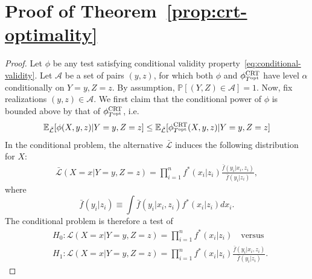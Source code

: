 \documentclass[ejs]{imsart}
\numberwithin{equation}{section}
\theoremstyle{plain}
\theoremstyle{definition}
\theoremstyle{remark}
\newcommand{\srx}{X}
\newcommand{\sfx}{x}
\newcommand{\srz}{Z}
\newcommand{\sfz}{z}
\newcommand{\sry}{Y}
\newcommand{\sfy}{y}
\def\CRT{\textnormal{CRT}}
\begin{document}



\appendix

\section{Proof of Theorem~\ref{prop:crt-optimality}} \label{sec:proofs-sec2}

\begin{proof}
Let $\phi$ be any test satisfying conditional validity property~\eqref{eq:conditional-validity}. Let $\mathcal A$ be a set of pairs $(\sfy, \sfz)$, for which both $\phi$ and $\phi^{\CRT}_{T^{\textnormal{opt}}}$ have level $\alpha$ conditionally on $\sry = \sfy, \srz = \sfz$. By assumption, $\mathbb P[(\sry, \srz) \in \mathcal A] = 1$. Now, fix realizations $(\sfy, \sfz) \in \mathcal A$. We first claim that the conditional power of $\phi$ is bounded above by that of $\phi^{\CRT}_{T^{\textnormal{opt}}}$, i.e.
	\begin{equation}
		\mathbb E_{\bar{\mathcal L}}[\phi(\srx,\sfy,\sfz)|\sry = \sfy, \srz = \sfz] \leq \mathbb E_{\bar{\mathcal L}}[\phi^{\CRT}_{T^\textnormal{opt}}(\srx, \sfy, \sfz)|\sry = \sfy, \srz = \sfz]
		\label{conditional-optimality}
	\end{equation}
	In the conditional problem, the alternative $\bar{\mathcal L}$ induces the following distribution for $\srx$:
	\begin{equation}
		\begin{split}
			\bar{\mathcal L}(\srx = \sfx|\sry = \sfy, \srz = \sfz) = \prod_{i = 1}^n  f^*(\sfx_i|\sfz_i)\tfrac{\bar f(\sfy_i|\sfx_i, \sfz_i)}{\bar f(\sfy_i|\sfz_i)},
			\label{conditional-alternative}
		\end{split}
	\end{equation}
	where
	\begin{equation*}
	\bar f(\sfy_i|\sfz_i) \equiv \int \bar f(\sfy_i|\sfx_i, \sfz_i)f^*(\sfx_i|\sfz_i)d\sfx_i.
	\end{equation*}	
	The conditional problem is therefore a test of 
	\begin{equation*}
		\begin{split}
			&H_0: \mathcal L(\srx = \sfx|\sry = \sfy, \srz = \sfz) = \prod_{i = 1}^n  f^*(\sfx_i | \sfz_i) \quad \text{versus} \\
			&H_1: \mathcal L(\srx = \sfx|\sry = \sfy, \srz = \sfz) = \prod_{i = 1}^n  f^*(\sfx_i|\sfz_i)\tfrac{\bar f(\sfy_i|\sfx_i, \sfz_i)}{\bar f(\sfy_i|\sfz_i)}.
		\end{split}

\end{equation*}
\end{proof}
\end{document}

